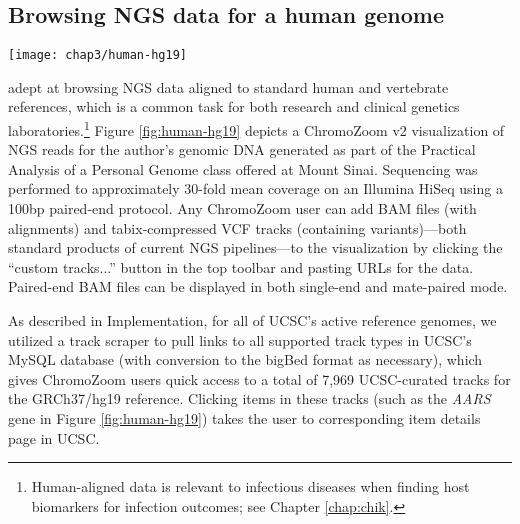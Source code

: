\subsection{Browsing NGS data for a human genome}

\begin{figure*}[htb]
  \texttt{[image: chap3/human-hg19]}
  \vspace{-1em}
  \caption[NGS reads for the author's genome aligned to GRCh37/hg19]{\textbf{NGS reads for the author's genome aligned to GRCh37/hg19}, displayed in paired mode, and corresponding variant calls. The ``UCSC Genes'' and ``ClinVar Main'' tracks are mirrored from UCSC, while the other two were loaded from URLs pasted into the interface by the user; ``alignedReadsPaired'' is in BAM format while ``calledVariants'' is a tabix-compressed VCF file. A heterozygous C/T variant in the \emph{AARS} coding sequence is visible to the righthand side, which is annotated in the ClinVar track as a benign variant (light gray G>A; annotated to reverse strand). More alignments are stacked vertically than can be displayed, as indicated by the orange clipping indicator, which could be remedied by resizing the tracks or using the adjacent scrollbar (mouse cursors).\vspace{1em}}
  \label{fig:human-hg19}
\end{figure*}

 adept at browsing NGS data aligned to standard human and vertebrate references, which is a common task for both research and clinical genetics laboratories.\footnote{Human-aligned data is relevant to infectious diseases when finding host biomarkers for infection outcomes; see Chapter \ref{chap:chik}.} Figure \ref{fig:human-hg19} depicts a ChromoZoom v2 visualization of NGS reads for the author's genomic DNA generated as part of the Practical Analysis of a Personal Genome class offered at Mount Sinai.\autocite{Linderman2015} Sequencing was performed to approximately 30-fold mean coverage on an Illumina HiSeq using a 100bp paired-end protocol. Any ChromoZoom user can add BAM files (with alignments) and tabix-compressed VCF tracks (containing variants)—both standard products of current NGS pipelines—to the visualization by clicking the ``custom tracks...'' button in the top toolbar and pasting URLs for the data. Paired-end BAM files can be displayed in both single-end and mate-paired mode.

As described in Implementation, for all of UCSC's active reference genomes, we utilized a track scraper to pull links to all supported track types in UCSC's MySQL database (with conversion to the bigBed format as necessary), which gives ChromoZoom users quick access to a total of 7,969 UCSC-curated tracks for the GRCh37/hg19 reference. Clicking items in these tracks (such as the \emph{AARS} gene in Figure \ref{fig:human-hg19}) takes the user to corresponding item details page in UCSC.

